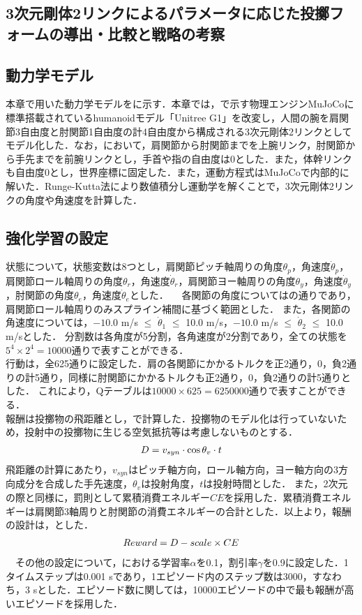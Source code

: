 \begin{small}
\section{3次元剛体2リンクによるパラメータに応じた投擲フォームの導出・比較と戦略の考察}
\subsection{動力学モデル}
本章で用いた動力学モデルをに示す．本章では，で示す物理エンジンMuJoCo\cite{mujoco}に標準搭載されているhumanoidモデル「Unitree G1」\cite{unitreeg1}を改変し，人間の腕を肩関節3自由度と肘関節1自由度の計4自由度から構成される3次元剛体2リンクとしてモデル化した．なお，において，肩関節から肘関節までを上腕リンク，肘関節から手先までを前腕リンクとし，手首や指の自由度は0とした．また，体幹リンクも自由度0とし，世界座標に固定した．また，運動方程式はMuJoCoで内部的に解いた．Runge-Kutta法により数値積分し運動学を解くことで，3次元剛体2リンクの角度や角速度を計算した．
\subsection{強化学習の設定}
状態について，状態変数は8つとし，肩関節ピッチ軸周りの角度$\theta_{p}$，角速度$\dot{\theta}_{p}$，肩関節ロール軸周りの角度$\theta_{r}$，角速度$\dot{\theta}_{r}$，肩関節ヨー軸周りの角度$\theta_{y}$，角速度$\dot{\theta}_{y}$，肘関節の角度$\theta_{e}$，角速度$\dot{\theta}_{e}$とした．
　各関節の角度についてはの通りであり，肩関節ロール軸周りのみスプライン補間に基づく範囲とした．
また，各関節の角速度については，$-10.0$ m/s $\le$ $\dot{\theta}_{1}$ $\le$ 10.0 m/s，$-10.0$ m/s $\le$ $\dot{\theta}_{2}$ $\le$ 10.0 m/sとした．
分割数は各角度が5分割，各角速度が2分割であり，全ての状態を$5^{4}\times 2^{4}=10000$通りで表すことができる．\\
行動は，全625通りに設定した．肩の各関節にかかるトルクを正2通り，0，負2通りの計5通り，同様に肘関節にかかるトルクも正2通り，0，負2通りの計5通りとした．
これにより，Qテーブルは$10000 \times 625=6250000$通りで表すことができる．\\
報酬は投擲物の飛距離とし，で計算した．投擲物のモデル化は行っていないため，投射中の投擲物に生じる空気抵抗等は考慮しないものとする．
\begin{eqnarray}
  \equlabel{14}
  D = v_{syn} \cdot \cos\theta_{v} \cdot t
\end{eqnarray}
飛距離の計算にあたり，$v_{syn}$はピッチ軸方向，ロール軸方向，ヨー軸方向の3方向成分を合成した手先速度，$\theta_{v}$は投射角度，$t$は投射時間とした．
また，2次元の際と同様に，罰則として累積消費エネルギー$CE$を採用した．累積消費エネルギーは肩関節3軸周りと肘関節の消費エネルギーの合計とした．以上より，報酬の設計は，とした．
\begin{eqnarray}
  \equlabel{15}
  Reward = D - scale \times CE
\end{eqnarray}
　その他の設定について，における学習率$\alpha$を0.1，割引率$\gamma$を0.9に設定した．1タイムステップは0.001 sであり，1エピソード内のステップ数は3000，すなわち，3 sとした．エピソード数に関しては，10000エピソードの中で最も報酬が高いエピソードを採用した．

\end{small}

